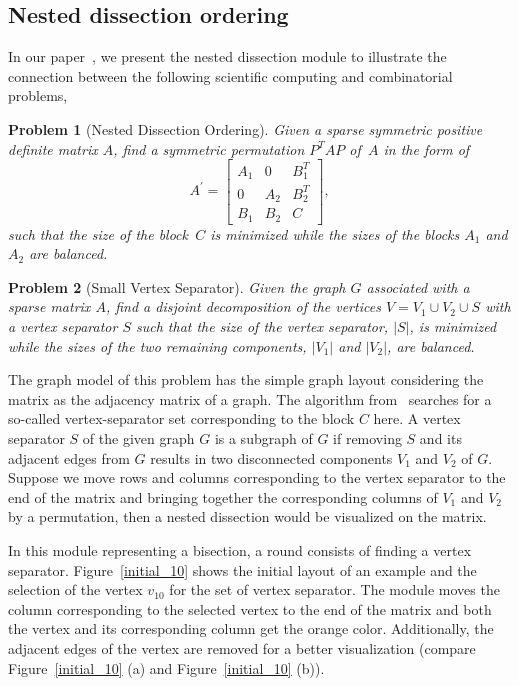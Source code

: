 \documentclass[12pt, twoside,a4paper,toc=bibliography]{scrbook}
\newtheorem{problem}{Problem}
\newcommand{\figref}[1]{Figure~\protect\ref{#1}}
\begin{document}
\subsection{Nested dissection ordering}
In our paper~\cite{2014:02}, we present the nested dissection module to
illustrate the connection between the following scientific computing and combinatorial problems,
\begin{problem}[Nested Dissection Ordering]
\label{p.nest.dissect}
Given a sparse symmetric positive
definite matrix $A$, find a symmetric permutation $P^T A P$ of~$A$ in the form of 
\begin{equation}
\label{e.A}
A^{\prime} =
\begin{bmatrix}
A_1 & 0   & B_1^T \\[0.2em]
0   & A_2 & B_2^T \\[0.2em]
B_1 & B_2 & C
\end{bmatrix} ,
\end{equation}
such that the size of the block~$C$ is minimized while the sizes of the blocks $A_1$ and $A_2$ are
balanced.

\end{problem}
\begin{problem}[Small Vertex Separator]
\label{p.small.ver.sep} Given the graph $G$ associated with a sparse
matrix $A$, find a disjoint decomposition of the vertices $V = V_1 \cup V_2 \cup S$ with a vertex
separator $S$ such that the size of the vertex separator, $|S|$, is minimized while the sizes of
the two remaining components, $|V_1|$ and $|V_2|$, are balanced.
\end{problem}

The graph model of this problem has the simple graph layout considering the matrix
as the adjacency matrix of a graph.
The algorithm from~\cite{2014:02} searches for a so-called vertex-separator set
corresponding to the block $C$ here. A vertex separator $S$ of the given graph $G$
is a subgraph of $G$ if removing $S$ and its adjacent edges from $G$ results in two
disconnected components $V_1$ and $V_2$ of $G$.
Suppose we move rows and columns corresponding to the vertex separator to the end of
the matrix and bringing together
the corresponding columns of $V_1$ and $V_2$ by a permutation,
then a nested dissection would be visualized on the matrix.

In this module representing a bisection, a round consists of finding a vertex separator.
Figure~\ref{initial_10} shows the initial layout of an example
and the selection of the vertex $v_10$ for the set of vertex separator. 
The module moves the
column corresponding to the selected vertex to the end of the matrix
and both the vertex and its corresponding column get the orange color.
Additionally, the adjacent edges of the vertex are removed for a better visualization
(compare \figref{initial_10} (a) and \figref{initial_10} (b)).
\end{document}
